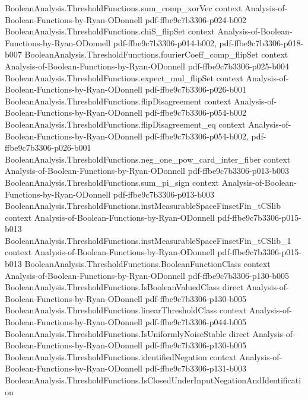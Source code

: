 \begin{theorem}
\proofstep
  {BooleanAnalysis.ThresholdFunctions.sum_comp_xorVec}
  {context}
  {Analysis-of-Boolean-Functions-by-Ryan-ODonnell}
  {pdf-ffbe9c7b3306-p024-b002}
\proofstep
  {BooleanAnalysis.ThresholdFunctions.chiS_flipSet}
  {context}
  {Analysis-of-Boolean-Functions-by-Ryan-ODonnell}
  {pdf-ffbe9c7b3306-p014-b002,
    pdf-ffbe9c7b3306-p018-b007}
\proofstep
  {BooleanAnalysis.ThresholdFunctions.fourierCoeff_comp_flipSet}
  {context}
  {Analysis-of-Boolean-Functions-by-Ryan-ODonnell}
  {pdf-ffbe9c7b3306-p025-b004}
\proofstep
  {BooleanAnalysis.ThresholdFunctions.expect_mul_flipSet}
  {context}
  {Analysis-of-Boolean-Functions-by-Ryan-ODonnell}
  {pdf-ffbe9c7b3306-p026-b001}
\proofstep
  {BooleanAnalysis.ThresholdFunctions.flipDisagreement}
  {context}
  {Analysis-of-Boolean-Functions-by-Ryan-ODonnell}
  {pdf-ffbe9c7b3306-p054-b002}
\proofstep
  {BooleanAnalysis.ThresholdFunctions.flipDisagreement_eq}
  {context}
  {Analysis-of-Boolean-Functions-by-Ryan-ODonnell}
  {pdf-ffbe9c7b3306-p054-b002,
    pdf-ffbe9c7b3306-p026-b001}
\proofstep
  {BooleanAnalysis.ThresholdFunctions.neg_one_pow_card_inter_fiber}
  {context}
  {Analysis-of-Boolean-Functions-by-Ryan-ODonnell}
  {pdf-ffbe9c7b3306-p013-b003}
\proofstep
  {BooleanAnalysis.ThresholdFunctions.sum_pi_sign}
  {context}
  {Analysis-of-Boolean-Functions-by-Ryan-ODonnell}
  {pdf-ffbe9c7b3306-p013-b003}
\proofstep
  {BooleanAnalysis.ThresholdFunctions.instMeasurableSpaceFinsetFin_tCSlib}
  {context}
  {Analysis-of-Boolean-Functions-by-Ryan-ODonnell}
  {pdf-ffbe9c7b3306-p015-b013}
\proofstep
  {BooleanAnalysis.ThresholdFunctions.instMeasurableSpaceFinsetFin_tCSlib_1}
  {context}
  {Analysis-of-Boolean-Functions-by-Ryan-ODonnell}
  {pdf-ffbe9c7b3306-p015-b013}
\proofstep
  {BooleanAnalysis.ThresholdFunctions.BooleanFunctionClass}
  {context}
  {Analysis-of-Boolean-Functions-by-Ryan-ODonnell}
  {pdf-ffbe9c7b3306-p130-b005}
\proofstep
  {BooleanAnalysis.ThresholdFunctions.IsBooleanValuedClass}
  {direct}
  {Analysis-of-Boolean-Functions-by-Ryan-ODonnell}
  {pdf-ffbe9c7b3306-p130-b005}
\proofstep
  {BooleanAnalysis.ThresholdFunctions.linearThresholdClass}
  {context}
  {Analysis-of-Boolean-Functions-by-Ryan-ODonnell}
  {pdf-ffbe9c7b3306-p044-b005}
\proofstep
  {BooleanAnalysis.ThresholdFunctions.IsUniformlyNoiseStable}
  {direct}
  {Analysis-of-Boolean-Functions-by-Ryan-ODonnell}
  {pdf-ffbe9c7b3306-p130-b005}
\proofstep
  {BooleanAnalysis.ThresholdFunctions.identifiedNegation}
  {context}
  {Analysis-of-Boolean-Functions-by-Ryan-ODonnell}
  {pdf-ffbe9c7b3306-p131-b003}
\proofstep
  {BooleanAnalysis.ThresholdFunctions.IsClosedUnderInputNegationAndIdentification}

\end{theorem}
